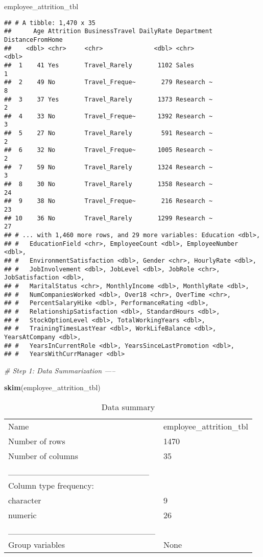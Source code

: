 \documentclass[
]{article}
\newenvironment{Shaded}{\begin{snugshade}}{\end{snugshade}}
\newcommand{\CommentTok}[1]{\textcolor[rgb]{0.56,0.35,0.01}{\textit{#1}}}
\newcommand{\KeywordTok}[1]{\textcolor[rgb]{0.13,0.29,0.53}{\textbf{#1}}}
\newcommand{\NormalTok}[1]{#1}
\begin{document}
\begin{Shaded}
\begin{Highlighting}[]
\NormalTok{employee_attrition_tbl}
\end{Highlighting}
\end{Shaded}

\begin{verbatim}
## # A tibble: 1,470 x 35
##      Age Attrition BusinessTravel DailyRate Department DistanceFromHome
##    <dbl> <chr>     <chr>              <dbl> <chr>                 <dbl>
##  1    41 Yes       Travel_Rarely       1102 Sales                     1
##  2    49 No        Travel_Freque~       279 Research ~                8
##  3    37 Yes       Travel_Rarely       1373 Research ~                2
##  4    33 No        Travel_Freque~      1392 Research ~                3
##  5    27 No        Travel_Rarely        591 Research ~                2
##  6    32 No        Travel_Freque~      1005 Research ~                2
##  7    59 No        Travel_Rarely       1324 Research ~                3
##  8    30 No        Travel_Rarely       1358 Research ~               24
##  9    38 No        Travel_Freque~       216 Research ~               23
## 10    36 No        Travel_Rarely       1299 Research ~               27
## # ... with 1,460 more rows, and 29 more variables: Education <dbl>,
## #   EducationField <chr>, EmployeeCount <dbl>, EmployeeNumber <dbl>,
## #   EnvironmentSatisfaction <dbl>, Gender <chr>, HourlyRate <dbl>,
## #   JobInvolvement <dbl>, JobLevel <dbl>, JobRole <chr>, JobSatisfaction <dbl>,
## #   MaritalStatus <chr>, MonthlyIncome <dbl>, MonthlyRate <dbl>,
## #   NumCompaniesWorked <dbl>, Over18 <chr>, OverTime <chr>,
## #   PercentSalaryHike <dbl>, PerformanceRating <dbl>,
## #   RelationshipSatisfaction <dbl>, StandardHours <dbl>,
## #   StockOptionLevel <dbl>, TotalWorkingYears <dbl>,
## #   TrainingTimesLastYear <dbl>, WorkLifeBalance <dbl>, YearsAtCompany <dbl>,
## #   YearsInCurrentRole <dbl>, YearsSinceLastPromotion <dbl>,
## #   YearsWithCurrManager <dbl>
\end{verbatim}

\begin{Shaded}
\begin{Highlighting}[]
\CommentTok{# Step 1: Data Summarization -----}

\KeywordTok{skim}\NormalTok{(employee_attrition_tbl)}
\end{Highlighting}
\end{Shaded}

\begin{longtable}[]{@{}ll@{}}
\caption{Data summary}\tabularnewline
\toprule
\endhead
Name & employee\_attrition\_tbl\tabularnewline
Number of rows & 1470\tabularnewline
Number of columns & 35\tabularnewline
\_\_\_\_\_\_\_\_\_\_\_\_\_\_\_\_\_\_\_\_\_\_\_ &\tabularnewline
Column type frequency: &\tabularnewline
character & 9\tabularnewline
numeric & 26\tabularnewline
\_\_\_\_\_\_\_\_\_\_\_\_\_\_\_\_\_\_\_\_\_\_\_\_ &\tabularnewline
Group variables & None\tabularnewline
\bottomrule
\end{longtable}
\end{document}
